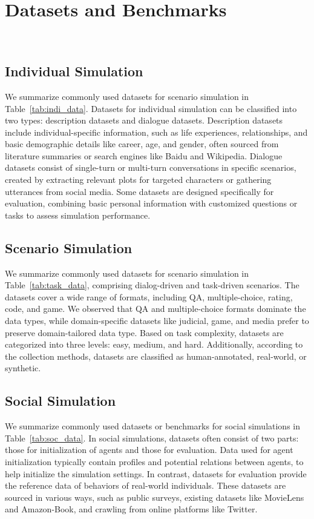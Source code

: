 

\section{Datasets and Benchmarks}~\label{sec:data}

\subsection{Individual Simulation}
We summarize commonly used datasets for scenario simulation in Table~\ref{tab:indi_data}. Datasets for individual simulation can be classified into two types: description datasets and dialogue datasets. Description datasets include individual-specific information, such as life experiences, relationships, and basic demographic details like career, age, and gender, often sourced from literature summaries or search engines like Baidu and Wikipedia. Dialogue datasets consist of single-turn or multi-turn conversations in specific scenarios, created by extracting relevant plots for targeted characters or gathering utterances from social media. Some datasets are designed specifically for evaluation, combining basic personal information with customized questions or tasks to assess simulation performance.

\subsection{Scenario Simulation}
We summarize commonly used datasets for scenario simulation in Table~\ref{tab:task_data}, comprising dialog-driven and task-driven scenarios. The datasets cover a wide range of formats, including QA, multiple-choice, rating, code, and game. We observed that QA and multiple-choice formats dominate the data types, while domain-specific datasets like judicial, game, and media prefer to preserve domain-tailored data type.
Based on task complexity, datasets are categorized into three levels: easy, medium, and hard.
Additionally, according to the collection methods, datasets are classified as human-annotated, real-world, or synthetic.


\subsection{Social Simulation}
We summarize commonly used datasets or benchmarks for social simulations in Table~\ref{tab:soc_data}. In social simulations, datasets often consist of two parts: those for initialization of agents and those for evaluation. Data used for agent initialization typically contain profiles and potential relations between agents, to help initialize the simulation settings. In contrast, datasets for evaluation provide the reference data of behaviors of real-world individuals. These datasets are sourced in various ways, such as public surveys, existing datasets like MovieLens and Amazon-Book, and crawling from online platforms like Twitter. 

